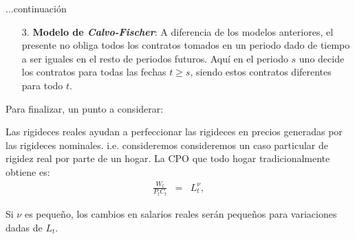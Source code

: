 \documentclass{beamer}
\begin{document}
\begin{frame}{...continuaci\'on}
\begin{enumerate}
\item[3.]{\textbf{Modelo de \emph{Calvo-Fischer}}: A diferencia de los modelos anteriores, el presente no obliga todos los contratos tomados en un periodo dado de tiempo a ser iguales en el resto de periodos futuros. Aqu\'i en el periodo $s$ uno decide los contratos para todas las fechas $t\geq s$, siendo estos contratos diferentes para todo $t$.}
\end{enumerate}

Para finalizar, un punto a considerar:

\medskip
Las rigideces reales ayudan a perfeccionar las rigideces en precios generadas por las rigideces nominales. i.e. consideremos consideremos un caso particular de rigidez real por parte de un hogar. La CPO que todo hogar tradicionalmente obtiene es: 
\begin{eqnarray*}
\frac{W_{t}}{P_{t}C_{t}} & = & L_{t}^{\nu},
\end{eqnarray*}

Si $\nu$ es peque\~no, los cambios en salarios reales ser\'an peque\~nos para variaciones dadas de $L_{t}$. 
\end{frame}
\end{document}
